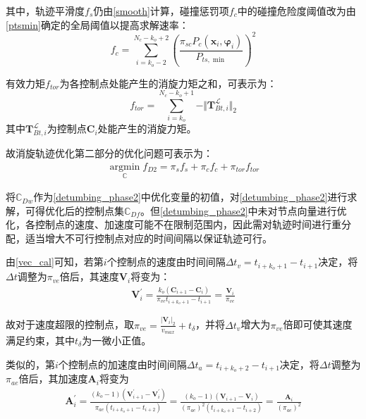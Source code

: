 \documentclass[lang=chs, degree=master, blindreview=false, winfonts=true]{yanputhesis}
\begin{document}
其中，轨迹平滑度$f_{s}$仍由\autoref{smooth}计算，碰撞惩罚项$f_{c}$中的碰撞危险度阈值改为由\autoref{ptsmin}确定的全局阈值以提高求解速率：
\begin{equation}
	\label{collision_cost2}
	f_{c}=\sum_{i=k_{o}-2}^{N_c-k_{o}+2}\left(\frac{\pi_{sc} P_c({\boldsymbol{x}}_{i},\boldsymbol{\varphi}_{i})}{P_{ts,\min}}\right)^2
\end{equation}

有效力矩$f_{tor}$为各控制点处能产生的消旋力矩之和，可表示为：
\begin{equation}
	f_{tor}=\sum_{i=k_{o}}^{N_c-k_{o}+1} -\Vert \boldsymbol{T}^{\mathcal{L}}_{Bt,i} \Vert_2
\end{equation}
其中$\boldsymbol{T}^{\mathcal{L}}_{Bt,i}$为控制点$\boldsymbol{C}_{i}$处能产生的消旋力矩。

故消旋轨迹优化第二部分的优化问题可表示为：
\begin{equation}
	\begin{aligned}
		\label{detumbing_phase2}
		\mathop{\arg\min}\limits_{\mathbb{C}} f_{D2}=\pi_{s}f_{s}+\pi_{c}f_{c}+\pi_{tor}f_{tor}
	\end{aligned}
\end{equation}

将$\mathbb{C}_{Dw}$作为\autoref{detumbing_phase2}中优化变量的初值，对\autoref{detumbing_phase2}进行求解，可得优化后的控制点集$\mathbb{C}_{Df}$。但\autoref{detumbing_phase2}中未对节点向量进行优化，各控制点的速度、加速度可能不在限制范围内，因此需对轨迹时间进行重分配，适当增大不可行控制点对应的时间间隔以保证轨迹可行。

由\autoref{vec_cal}可知，若第$i$个控制点的速度由时间间隔$\Delta t_{v} =t_{i+k_{o}+1}-t_{i+1}$决定，将$\Delta t$调整为$\pi_{ve}$倍后，其速度$\boldsymbol{V}_{i}$将变为：
\begin{equation}
	\begin{aligned}
		\boldsymbol{V}_{i}^{\prime}=\frac{k_{o}\left(\boldsymbol{C}_{i+1}-\boldsymbol{C}_i\right)}{\pi_{ve}t_{i+k_{o}+1}-t_{i+1}}
		=\frac{\boldsymbol{V}_{i}}{\pi_{ve}}
	\end{aligned}
\end{equation}

故对于速度超限的控制点，取$\pi_{ve}=\frac{\vert \boldsymbol{V}_{i}\vert_2}{v_{max}}+t_{\delta}$，并将$\Delta t_{v}$增大为$\pi_{ve}$倍即可使其速度满足约束，其中$t_{\delta}$为一微小正值。

类似的，第$i$个控制点的加速度由时间间隔$\Delta t_{a} =t_{i+k_{o}+2}-t_{i+1}$决定，将$\Delta t$调整为$\pi_{ae}$倍后，其加速度$\boldsymbol{A}_{i}$将变为
\begin{equation}
	\begin{aligned}
		\boldsymbol{A}_{i}^{\prime}=\frac{\left(k_{o}-1\right)\left(\boldsymbol{V}_{i+1}^{\prime}-\boldsymbol{V}_i^{\prime}\right)}{\pi_{ae}(t_{i+k_{o}+1}-t_{i+2})}
		=\frac{\left(k_{o}-1\right)\left(\boldsymbol{V}_{i+1}-\boldsymbol{V}_i\right)}{(\pi_{ae})^2(t_{i+k_{o}+1}-t_{i+2})}
		=\frac{\boldsymbol{A}_{i}}{(\pi_{ae})^2}
	\end{aligned}
\end{equation}
\end{document}
